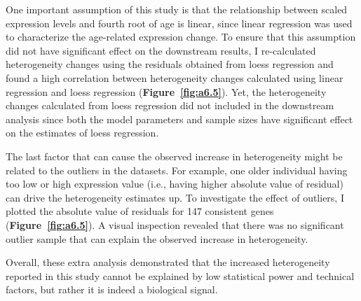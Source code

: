 One important assumption of this study is that the relationship between scaled expression levels and fourth root of age is linear,
since linear regression was used to characterize the age-related expression change.
To ensure that this assumption did not have significant effect on the downstream results, 
I re-calculated heterogeneity changes using the residuals obtained from loess regression and 
found a high correlation between heterogeneity changes calculated using linear regression and loess regression (\textbf{Figure~\ref{fig:a6.5}}).
Yet, the heterogeneity changes calculated from loess regression did not included in the downstream analysis
since both the model parameters and sample sizes have significant effect on the estimates of loess regression.

The last factor that can cause the observed increase in heterogeneity might be related to the outliers in the datasets.
For example, one older individual having too low or high expression value (i.e., having higher absolute value of residual) 
can drive the heterogeneity estimates up.
To investigate the effect of outliers, I plotted the absolute value of residuals for 147 consistent genes (\textbf{Figure~\ref{fig:a6.5}}).
A visual inspection revealed that there was no significant outlier sample that can explain the observed increase in heterogeneity.

Overall, these extra analysis demonstrated that the increased heterogeneity reported in this study cannot be explained by low statistical power and technical factors,
but rather it is indeed a biological signal.

